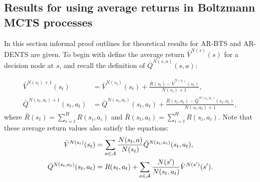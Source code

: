     


















\subsection{Results for using average returns in Boltzmann MCTS processes} \label{sec:ar_proofs}



    In this section informal proof outlines for theoretical results for AR-BTS and AR-DENTS are given. To begin with define the average return $\bar{V}^{N(s)}(s)$ for a decision node at $s$, and recall the definition of $\bar{Q}^{N(s,a)}(s, a)$:

    \begin{align}
        \bar{V}^{N(s_t)+1}(s_t) &= \bar{V}^{N(s_t)}(s_t) + \frac{\bar{R}(s_t) - \bar{V}^{N(s_t)}(s_t)}{N(s_t) + 1},  \label{appeq:ar_v} \\
        \bar{Q}^{N(s_t,a_t)+1}(s_t, a_t) &= \bar{Q}^{N(s_t,a_t)}(s_t, a_t) 
            + \frac{\bar{R}(s_t,a_t) - \bar{Q}^{N(s_t,a_t)}(s_t, a_t)}{N(s_t, a_t) + 1},  \label{appeq:ar_q}
    \end{align}
    where $\bar{R}(s_t)=\sum_{i=t}^H R(s_i,a_i)$ and $\bar{R}(s_t, a_t)=\sum_{i=t}^H R(s_i,a_i)$. Note that these average return values also satisfy the equations:
    \begin{align}
        \bar{V}^{N(s_t)}(s_t) &= \sum_{a\in\mathcal{A}} \frac{N(s_t,a)}{N(s_t)} \bar{Q}^{N(s_t,a_t)}(s_t, a_t), \label{appeq:ar_v_rel} \\
        \bar{Q}^{N(s_t,a_t)}(s_t, a_t) 
            &= R(s_t,a_t) + \sum_{a\in\mathcal{A}} \frac{N(s')}{N(s_t,a_t)} \bar{V}^{N(s')}(s'). \label{appeq:ar_q_rel}
    \end{align}










